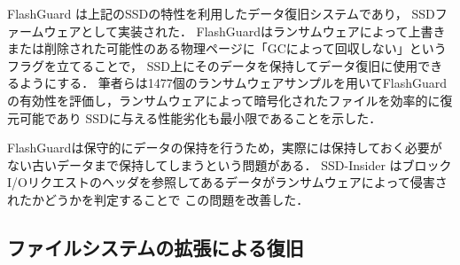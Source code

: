 FlashGuard \cite{huang2017flashguard} は上記のSSDの特性を利用したデータ復旧システムであり，
SSDファームウェアとして実装された．
FlashGuardはランサムウェアによって上書きまたは削除された可能性のある物理ページに「GCによって回収しない」というフラグを立てることで，
SSD上にそのデータを保持してデータ復旧に使用できるようにする．
筆者らは1477個のランサムウェアサンプルを用いてFlashGuardの有効性を評価し，ランサムウェアによって暗号化されたファイルを効率的に復元可能であり
SSDに与える性能劣化も最小限であることを示した．

FlashGuardは保守的にデータの保持を行うため，実際には保持しておく必要がない古いデータまで保持してしまうという問題がある．
SSD-Insider \cite{baek2018ssd} はブロックI/Oリクエストのヘッダを参照してあるデータがランサムウェアによって侵害されたかどうかを判定することで
この問題を改善した．




\subsection{ファイルシステムの拡張による復旧}


